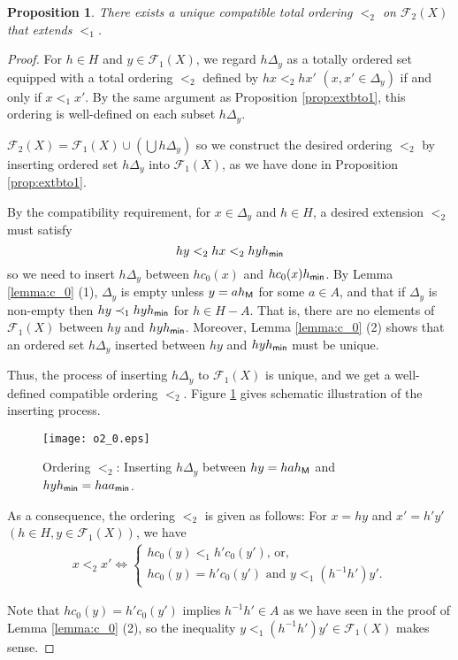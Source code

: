 \documentclass[10pt]{amsart}
\newtheorem{proposition}[theorem]{Proposition}
\numberwithin{equation}{section}
\begin{document}
\begin{proposition}
\label{prop:ext1to2}
There exists a unique compatible total ordering $<_{2}$ on ${\mathcal{F}}_{2}(X)$ that extends $<_{1}$.
\end{proposition}
\begin{proof}

For $h \in H$ and $y \in {\mathcal{F}}_{1}(X)$, we regard $h\Delta_{y}$ as a totally ordered set equipped with a total ordering $<_{2}$ defined by $hx <_{2}hx'$ $(x,x' \in \Delta_{y})$ if and only if $x <_{1} x'$. By the same argument as 
Proposition \ref{prop:extbto1}, this ordering is well-defined on each subset $h\Delta_{y}$.

${\mathcal{F}}_{2}(X) = {\mathcal{F}}_{1}(X) \cup \left(\bigcup h\Delta_{y} \right)$ so we construct the desired ordering $<_{2}$ by inserting ordered set $h\Delta_{y}$ into ${\mathcal{F}}_{1}(X)$, as we have done in Proposition \ref{prop:extbto1}.

By the compatibility requirement, for $x \in \Delta_{y}$ and $h \in H$, a desired extension $<_{2}$ must satisfy 
\[ hy <_{2} hx <_{2} hyh_{\sf min} \]
so we need to insert $h \Delta_{y}$ between $hc_{0}(x)$ and $h c_{0}(x) h_{\sf min}$. By Lemma \ref{lemma:c_0} (1), $\Delta_{y}$ is empty unless $y=ah_{\sf M}$ for some $a \in A$, and that if $\Delta_{y}$ is non-empty then $hy \prec_{1} hyh_{\sf min}$ for $h \in H-A$. That is, there are no elements of ${\mathcal{F}}_{1}(X)$ between $hy$ and $hyh_{\sf min}$. Moreover, Lemma \ref{lemma:c_0} (2) shows that an ordered set $h\Delta_{y}$ inserted between $hy$ and $hyh_{\sf min}$ must be unique.

Thus, the process of inserting $h\Delta_{y}$ to ${\mathcal{F}}_{1}(X)$ is unique, and we get a well-defined compatible ordering $<_{2}$. Figure \ref{fig:o2} gives schematic illustration of the inserting process.

\begin{figure}[htbp]
 \begin{center}
\texttt{[image: o2\_0.eps]}
\caption{Ordering $<_{2}$: Inserting $h\Delta_{y}$ between $hy=hah_{\sf M}$ and $hyh_{\sf min} = haa_{\sf min}$.}
\label{fig:o2}
\end{center}
\end{figure}

As a consequence, the ordering $<_{2}$ is given as follows:
For $x = hy$ and $ x'=h'y'$ $(h \in H, y \in {\mathcal{F}}_{1}(X))$, we have
\begin{gather}
\label{eqn:o2}
x <_{2} x' \iff 
\begin{cases}
hc_{0}(y) <_{1} h'c_{0}(y') \text{, or,}\\
hc_{0}(y)=h'c_{0}(y') \text{ and } y <_{1} (h^{-1}h')y'.
\end{cases}
\end{gather}

Note that $hc_{0}(y)=h'c_{0}(y')$ implies $h^{-1}h' \in A$ as we have seen in the proof of Lemma \ref{lemma:c_0} (2), so the inequality $ y <_{1} (h^{-1}h')y' \in {\mathcal{F}}_{1}(X)$ makes sense.

\end{proof}
\end{document}
